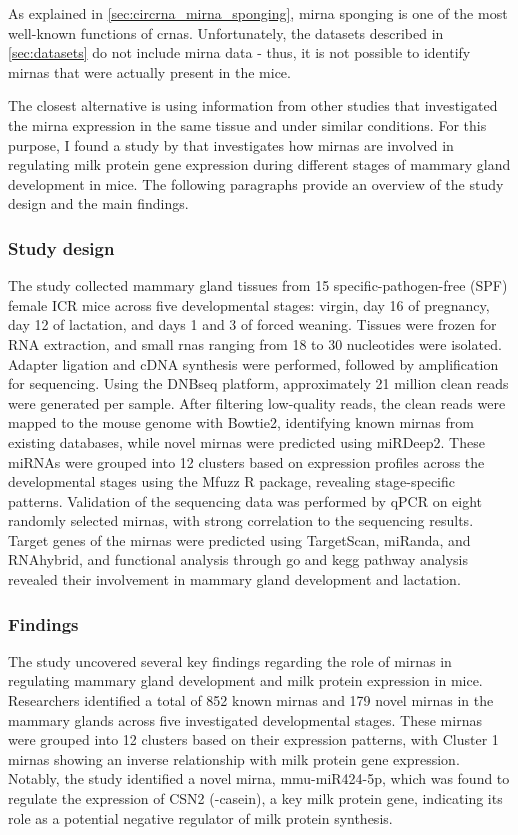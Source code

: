 As explained in \cref{sec:circrna_mirna_sponging}, \gls{mirna} sponging is one of
the most well-known functions of \glspl{crna}.
Unfortunately, the datasets described in \cref{sec:datasets} do not include
\gls{mirna} data - thus, it is not possible to identify \glspl{mirna} that were
actually present in the mice.

The closest alternative is using information from other studies that
investigated the \gls{mirna} expression in the same tissue and under similar
conditions.
For this purpose, I found a study by \textcite{wang_dynamic_2022} that
investigates how \glspl{mirna} are involved in regulating milk protein gene
expression during different stages of mammary gland development in mice.
The following paragraphs provide an overview of the study design and the main
findings.

\subsubsection{Study design}
The study collected mammary gland tissues from 15 specific-pathogen-free (SPF)
female ICR mice across five developmental stages: virgin, day 16 of pregnancy,
day 12 of lactation, and days 1 and 3 of forced weaning.
Tissues were frozen for RNA extraction, and small \glspl{rna} ranging from 18
to 30 nucleotides were isolated.
Adapter ligation and cDNA synthesis were performed, followed by amplification
for sequencing.
Using the DNBseq platform, approximately 21 million clean reads were generated
per sample.
After filtering low-quality reads, the clean reads were mapped to the mouse
genome with Bowtie2, identifying known \glspl{mirna} from existing databases,
while novel \glspl{mirna} were predicted using miRDeep2.
These miRNAs were grouped into 12 clusters based on expression profiles across
the developmental stages using the Mfuzz R package, revealing stage-specific
patterns.
Validation of the sequencing data was performed by qPCR on eight randomly
selected \glspl{mirna}, with strong correlation to the sequencing results.
Target genes of the \glspl{mirna} were predicted using TargetScan, miRanda, and
RNAhybrid, and functional analysis through \gls{go} and \gls{kegg} pathway
analysis revealed their involvement in mammary gland development and
lactation\supercite{wang_dynamic_2022}.

\subsubsection{Findings}
The study uncovered several key findings regarding the role of \glspl{mirna} in
regulating mammary gland development and milk protein expression in mice.
Researchers identified a total of 852 known \glspl{mirna} and 179 novel
\glspl{mirna} in the mammary glands across five investigated developmental
stages.
These \glspl{mirna} were grouped into 12 clusters based on their expression
patterns, with Cluster 1 \glspl{mirna} showing an inverse relationship with
milk protein gene expression.
Notably, the study identified a novel \gls{mirna}, mmu-miR424-5p, which was
found to regulate the expression of CSN2 (\textbeta{}-casein), a key milk
protein gene, indicating its role as a potential negative regulator of milk
protein synthesis\supercite{wang_dynamic_2022}.

